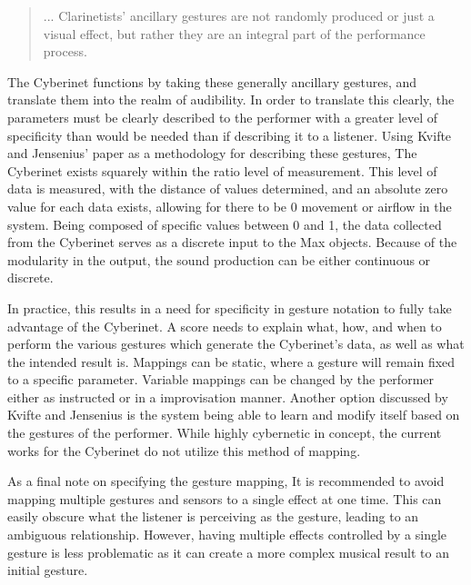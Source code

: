 \begin{quote}
    ... Clarinetists' ancillary gestures are not randomly produced or just a visual effect, but rather they are an integral part of the performance process\cite{wanderleyClarinetGesture2005}.
\end{quote}

The Cyberinet functions by taking these generally ancillary gestures, and translate them into the realm of audibility. In order to translate this clearly, the parameters must be clearly described to the performer with a  greater level of specificity than would be needed than if describing it to a listener\cite{KvifteJenseniusDescription}. Using Kvifte and Jensenius' paper as a methodology for describing these gestures, The Cyberinet exists squarely within the ratio level of measurement. This level of data is measured, with the distance of values determined, and an absolute zero value for each data exists, allowing for there to be 0 movement or airflow in the system. Being composed of specific values between 0 and 1, the data collected from the Cyberinet serves as a discrete input to the Max objects. Because of the modularity in the output, the sound production can be either continuous or discrete.

In practice, this results in a need for specificity in gesture notation to fully take advantage of the Cyberinet. A score needs to explain what, how, and when to perform the various gestures which generate the Cyberinet's data, as well as what the intended result is. Mappings can be static, where a gesture will remain fixed to a specific parameter. Variable mappings can be changed by the performer either as instructed or in a improvisation manner. Another option discussed by Kvifte and Jensenius is the system being able to learn and modify itself based on the gestures of the performer\cite{KvifteJenseniusDescription}. While highly cybernetic in concept, the current works for the Cyberinet do not utilize this method of mapping.

As a final note on specifying the gesture mapping, It is recommended to avoid mapping multiple gestures and sensors to a single effect at one time. This can easily obscure what the listener is perceiving as the gesture, leading to an ambiguous relationship. However, having multiple effects controlled by a single gesture is less problematic as it can create a more complex musical result to an initial gesture.

